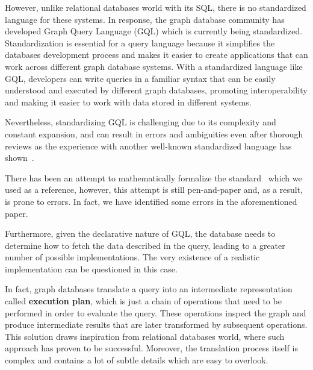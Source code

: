 \documentclass[14pt]{constructor-thesis}
\theoremstyle{definition}
\begin{document}
However, unlike relational databases world with its SQL, there is no standardized language for these systems. In response, the graph database community has developed Graph Query Language (GQL) which is currently being standardized. Standardization is essential for a query language because it simplifies the databases development process and makes it easier to create applications that can work across different graph database systems. With a standardized language like GQL, developers can write queries in a familiar syntax that can be easily understood and executed by different graph databases, promoting interoperability and making it easier to work with data stored in different systems.

Nevertheless, standardizing GQL is challenging due to its complexity and constant expansion, and can result in errors and ambiguities even after thorough reviews as the experience with another well-known standardized language has shown~\cite{cpp-std-verified}.

There has been an attempt to mathematically formalize the standard~\cite{GQL-formalized-on-paper} which we used as a reference, however, this attempt is still pen-and-paper and, as a result, is prone to errors. In fact, we have identified some errors in the aforementioned paper.


Furthermore, given the declarative nature of GQL, the database needs to determine how to fetch the data described in the query, leading to a greater number of possible implementations. The very existence of a realistic implementation can be questioned in this case.

In fact, graph databases translate a query into an intermediate representation called \textbf{execution plan}, which is just a chain of operations that need to be performed in order to evaluate the query. These operations inspect the graph and produce intermediate results that are later transformed by subsequent operations. This solution draws inspiration from relational databases world, where such approach has proven to be successful. Moreover, the translation process itself is complex and contains a lot of subtle details which are easy to overlook.


\end{document}
